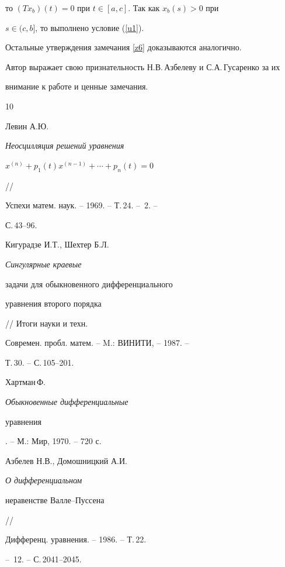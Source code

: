 то $(Tx_b)(t)=0$ при $t\in[a,c]$. Так как $x_b(s)>0$ при


$s\in(c,b]$, то выполнено условие (\ref{u1}).





Остальные утверждения замечания \ref{z6} доказываются аналогично.


\medskip





Автор выражает свою признательность Н.В.\,Азбелеву и С.А.\,Гусаренко за их


внимание к работе и ценные замечания.





\begin{thebibliography} {10}





 Левин А.Ю. {\em Неосцилляция решений уравнения


$x^{(n)}+p_1(t)x^{(n-1)}+\dotsb+p_n(t)=0$} //


Успехи матем. наук. -- 1969. -- Т.\,24. -- \No\,2. --


С.\,43--96.





 Кигурадзе И.Т., Шехтер Б.Л. {\em Сингулярные краевые


задачи для обыкновенного дифференциального


уравнения второго порядка} // Итоги науки и техн.


Современ. пробл. матем. -- M.: ВИНИТИ, -- 1987. --


Т.\,30. -- С.\,105--201.





 Хартман\,Ф. {\em Обыкновенные дифференциальные


уравнения}. -- М.: Мир, 1970. -- 720 с.





 Азбелев Н.В., Домошницкий А.И. {\em О дифференциальном


неравенстве Валле--Пуссена} //


Дифференц. уравнения. -- 1986. -- Т.\,22.


-- \No\,12. -- С.\,2041--2045.






\end{thebibliography}
